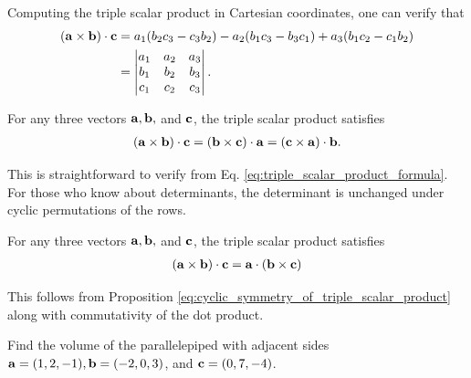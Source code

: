 \documentclass[12pt,letterpaper,reqno]{article}
\numberwithin{equation}{section}
\begin{document}
Computing the triple scalar product in Cartesian coordinates, one can verify that 
\begin{equation}\label{eq:triple_scalar_product_formula}
\begin{split}
		({\bf a} \times {\bf b}) \cdot {{\bf c}}&=a_1(b_2c_3-c_3b_2)-a_2(b_1c_3-b_3c_1)+a_3(b_1c_2-c_1b_2)	 \\
		&=\begin{vmatrix}
		a_1 & a_2 & a_3 \\
		b_1 & b_2 & b_3 \\
		c_1 & c_2 & c_3  
	\end{vmatrix}. \\
\end{split}
\end{equation}

\begin{prop}\label{eq:cyclic_symmetry_of_triple_scalar_product}
For any three vectors ${\bf a}, {\bf b},$ and ${\bf c}$, the triple scalar product satisfies
\begin{align*}
	({\bf a} \times {\bf b}) \cdot {\bf c}=({\bf b} \times {\bf c}) \cdot {\bf a}=({\bf c} \times {\bf a}) \cdot {\bf b}.
\end{align*}	
\end{prop}

\begin{pf}
This is straightforward to verify from Eq. \eqref{eq:triple_scalar_product_formula}. For those who know about determinants, the determinant is unchanged under cyclic permutations of the rows.
\end{pf}

\begin{cor}
For any three vectors ${\bf a}, {\bf b},$ and ${\bf c}$, the triple scalar product satisfies
\begin{align*}
	({\bf a} \times {\bf b}) \cdot {\bf c}={\bf a}\cdot ({\bf b} \times {\bf c})
\end{align*}	
\end{cor}

\begin{pf}
This follows from Proposition \ref{eq:cyclic_symmetry_of_triple_scalar_product} along with commutativity of the dot product.	
\end{pf}

\begin{exercise}
Find the volume of the parallelepiped with adjacent sides ${\bf a}=(1,2,-1), {\bf b}=(-2,0,3)$, and ${\bf c}=(0,7,-4)$.	
\end{exercise}
\end{document}
